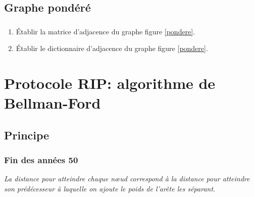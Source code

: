 \documentclass[svgnames,11pt]{beamer}
\begin{document}
\subsection{Graphe pondéré}
\begin{frame}
    \frametitle{}

    \begin{center}
        \label{pondere}
    \end{center}

\end{frame}

\begin{frame}
    \frametitle{}

    \begin{activite}
        \begin{enumerate}
            \item Établir la matrice d'adjacence du graphe figure \ref{pondere}.
            \item Établir le dictionnaire d'adjacence du graphe figure \ref{pondere}.
        \end{enumerate}
    \end{activite}

\end{frame}

\section{Protocole RIP: algorithme de Bellman-Ford}
\subsection{Principe}
\begin{frame}
    \frametitle{Fin des années 50}

    \begin{center}
        \emph{La distance pour atteindre chaque nœud correspond à la distance pour atteindre son prédécesseur à laquelle on ajoute le poids de l'arête les séparant.}
    \end{center}

\end{frame}
\end{document}

